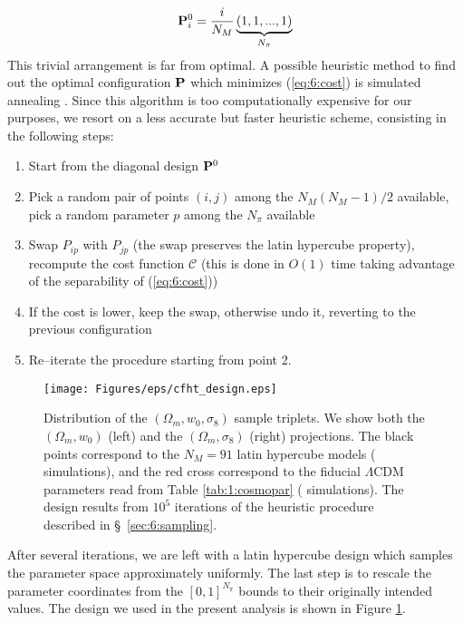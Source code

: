 \begin{equation}
\label{eq:6:diagonal}
\mathbf{P}^0_{i} = \frac{i}{N_M}\underbrace{(1,1,...,1)}_{N_\pi}
\end{equation}
%  
This trivial arrangement is far from optimal. A possible heuristic method to find out the optimal configuration $\mathbf{P}$ which minimizes (\ref{eq:6:cost}) is simulated annealing \citep{Skiena}. Since this algorithm is too computationally expensive for our purposes, we resort on a less accurate but faster heuristic scheme, consisting in the following steps: 
\begin{enumerate}
\item Start from the diagonal design $\mathbf{P}^0$
\item Pick a random pair of points $(i,j)$ among the $N_M(N_M-1)/2$ available, pick a random parameter $p$ among the $N_\pi$ available
\item Swap $P_{ip}$ with $P_{jp}$ (the swap preserves the latin hypercube property), recompute the cost function $\mathcal{C}$ (this is done in $O(1)$ time taking advantage of the separability of (\ref{eq:6:cost}))
\item If the cost is lower, keep the swap, otherwise undo it, reverting to the previous configuration
\item Re--iterate the procedure starting from point 2. 
\end{enumerate}
%
\begin{figure}
\begin{center}
\texttt{[image: Figures/eps/cfht\_design.eps]}
\end{center}
\caption{Distribution of the $(\Omega_m,w_0,\sigma_8)$ sample triplets. We show both the $(\Omega_m,w_0)$ (left) and the $(\Omega_m,\sigma_8)$ (right) projections. The black points correspond to the $N_M=91$ latin hypercube models ( simulations), and the red cross correspond to the fiducial $\Lambda$CDM parameters read from Table \ref{tab:1:cosmopar} ( simulations). The design results from $10^5$ iterations of the heuristic procedure described in \S~\ref{sec:6:sampling}.}
\label{fig:6:sampling}
\end{figure}
%
After several iterations, we are left with a latin hypercube design which samples the parameter space approximately uniformly. The last step is to rescale the parameter coordinates from the $[0,1]^{N_\pi}$ bounds to their originally intended values. The design we used in the present analysis is shown in Figure \ref{fig:6:sampling}. 

